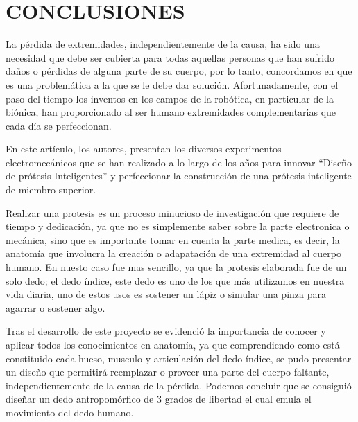 \documentclass{article}
\begin{document}
\newpage
\section{CONCLUSIONES}
La pérdida de extremidades, independientemente de la causa, ha sido una necesidad que debe ser cubierta para todas aquellas personas que han sufrido daños o pérdidas de alguna parte de su cuerpo,  por lo tanto, concordamos en que es una problemática a la que se le debe dar solución. 
Afortunadamente, con el paso del tiempo los inventos en los campos de la robótica, en particular de la biónica, han proporcionado al ser humano extremidades complementarias que cada día se perfeccionan. 

En este artículo, los autores, presentan los diversos experimentos electromecánicos que se han realizado a lo largo de los años para innovar “Diseño de prótesis Inteligentes” y perfeccionar la construcción de una prótesis inteligente de miembro superior\cite{apastyle2}.

Realizar una protesis es un proceso minucioso de investigación que requiere de tiempo y dedicación, ya que no es simplemente saber sobre la parte electronica o mecánica, sino que es importante tomar en cuenta la parte medica, es decir, la anatomía que involucra la creación o adapatación de una extremidad al cuerpo humano. En nuesto caso fue mas sencillo, ya que la protesis elaborada fue de un solo dedo; el dedo índice, este dedo es uno de los que más utilizamos en nuestra vida diaria, uno de estos usos es sostener un lápiz o simular una pinza para agarrar o sostener algo. 

Tras el desarrollo de este proyecto se evidenció la importancia de conocer y aplicar
todos los conocimientos en anatomía, ya que comprendiendo como está constituido
cada hueso, musculo y articulación del dedo índice, se pudo presentar un diseño que
permitirá reemplazar o proveer una parte del cuerpo faltante, independientemente de
la causa de la pérdida. Podemos concluir que se consiguió diseñar un dedo antropomórfico de 3 grados de libertad el cual emula el
movimiento del dedo humano\cite{apastyle}.

\newpage





\end{document}
